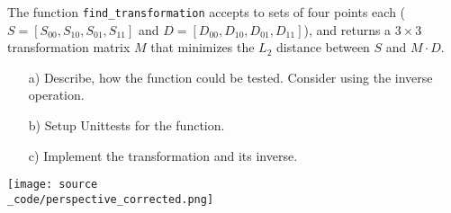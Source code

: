 The function \texttt{find\_transformation} accepts to sets of four points each ($S=[S_{00},S_{10},S_{01},S_{11}]$ and $D=[D_{00},D_{10},D_{01},D_{11}]$), and returns a $3 \times 3$
transformation matrix $M$ that minimizes the $L_2$ distance between $S$ and $M \cdot D$.

\begin{enumerate}
\item[a)] Describe, how the function could be tested. Consider using the inverse operation.
\item[b)] Setup Unittests for the function.
\item[c)] Implement the transformation and its inverse.
\end{enumerate}

\begin{center}
\texttt{[image: source\\\_code/perspective\_corrected.png]}
\end{center}

